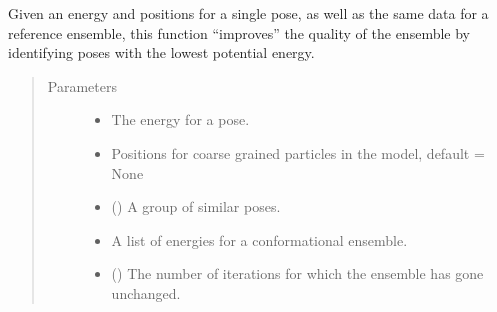 \documentclass[letterpaper,12pt,english,openany,oneside]{sphinxmanual}
\begin{document}
\begin{fulllineitems}
\label{\detokenize{ensembles:ensembles.ens_build.improve_ensemble}}
Given an energy and positions for a single pose, as well as the same data for a reference ensemble, this function “improves” the quality of the ensemble by identifying poses with the lowest potential energy.
\begin{quote}\begin{description}
\item[{Parameters}] \leavevmode\begin{itemize}
\item {} 
 \textendash{} The energy for a pose.

\item {} 
 \textendash{} Positions for coarse grained particles in the model, default = None

\item {} 
 (\sphinxstyleliteralemphasis{\sphinxupquote{(}}\sphinxstyleliteralemphasis{\sphinxupquote{(}}\sphinxstyleliteralemphasis{\sphinxupquote{(}}\sphinxstyleliteralemphasis{\sphinxupquote{ (}}\sphinxstyleliteralemphasis{\sphinxupquote{)}}\sphinxstyleliteralemphasis{\sphinxupquote{)}}\sphinxstyleliteralemphasis{\sphinxupquote{)}}\sphinxstyleliteralemphasis{\sphinxupquote{)}}) \textendash{} A group of similar poses.

\item {} 
 \textendash{} A list of energies for a conformational ensemble.

\item {} 
 () \textendash{} The number of iterations for which the ensemble has gone unchanged.


\end{itemize}
\end{description}
\end{quote}
\end{fulllineitems}
\end{document}
